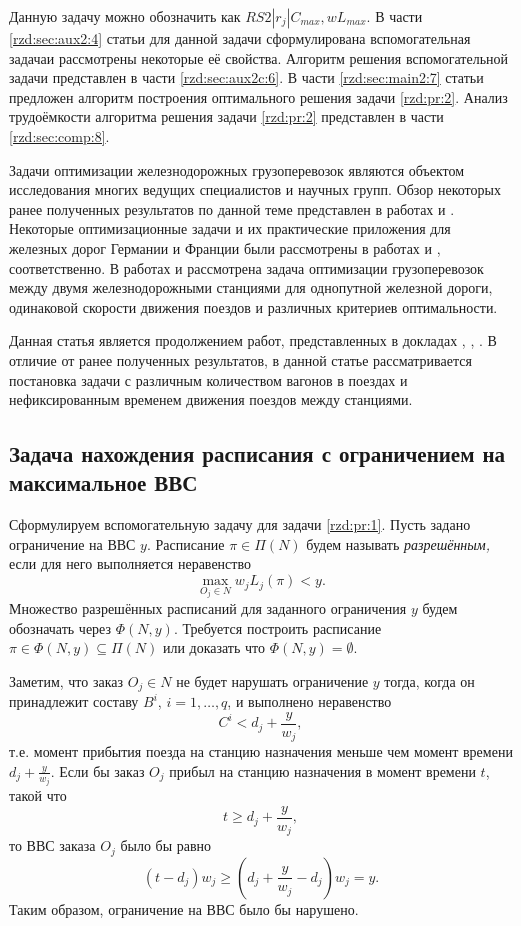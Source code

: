 Данную задачу можно обозначить как $RS2|r_j|C_{max}, wL_{max}$. В части \ref{rzd:sec:aux2:4} статьи для данной задачи сформулирована вспомогательная задачаи рассмотрены некоторые её свойства. Алгоритм решения вспомогательной задачи представлен в части \ref{rzd:sec:aux2c:6}. В части \ref{rzd:sec:main2:7} статьи предложен алгоритм построения оптимального решения задачи \ref{rzd:pr:2}. Анализ трудоёмкости алгоритма решения задачи \ref{rzd:pr:2} представлен в части \ref{rzd:sec:comp:8}.

Задачи оптимизации железнодорожных грузоперевозок являются объектом исследования многих ведущих специалистов и научных групп. Обзор некоторых ранее полученных результатов по данной теме представлен в работах \cite{CTV:2000} и \cite{dO:2001}. Некоторые оптимизационные задачи и их практические приложения для железных дорог Германии и Франции были рассмотрены в работах \cite{BHK:2002} и \cite{S:2011}, соответственно. В работах \cite{GDL:2015} и \cite{DKL:2014} рассмотрена задача оптимизации грузоперевозок между двумя железнодорожными станциями для однопутной железной дороги, одинаковой скорости движения поездов и различных критериев оптимальности.

Данная статья является продолжением работ, представленных в докладах \cite{LMA:2012}, \cite{AL:2012}, \cite{AL:2014}. В отличие от ранее полученных результатов, в данной статье рассматривается постановка задачи с различным количеством вагонов в поездах и нефиксированным временем движения поездов между станциями.


\subsection{Задача нахождения расписания с ограничением на максимальное ВВС}\label{rzd:sec:aux1:2}
Сформулируем вспомогательную задачу для задачи \ref{rzd:pr:1}.
Пусть задано ограничение на ВВС $y$. Расписание $\pi \in \Pi(N)$ будем называть \textit{разрешённым,} если для него выполняется неравенство
$$\max\limits_{O_j\in N}w_j L_j(\pi) < y.$$
Множество разрешённых расписаний для заданного ограничения $y$ будем обозначать через $\Phi(N, y)$. Требуется построить расписание $\pi \in \Phi(N, y) \subseteq \Pi(N)$ или доказать что $\Phi(N, y) = \emptyset$.

Заметим, что заказ $O_j \in N$ не будет нарушать ограничение $y$ тогда, когда он принадлежит составу $B^i$, $i=1, \dots, q$, и выполнено неравенство
$$C^i < d_j + \frac{y}{w_j},$$
т.е. момент прибытия поезда на станцию назначения меньше чем момент времени $d_j + \frac{y}{w_j}$. Если бы заказ $O_j$ прибыл на станцию назначения в момент времени $t$, такой что
$$t \geq d_j + \frac{y}{w_j},$$
то ВВС заказа $O_j$ было бы равно
$$(t - d_j)w_j \geq (d_j + \frac{y}{w_j} - d_j)w_j = y.$$
Таким образом, ограничение на ВВС было бы нарушено.

